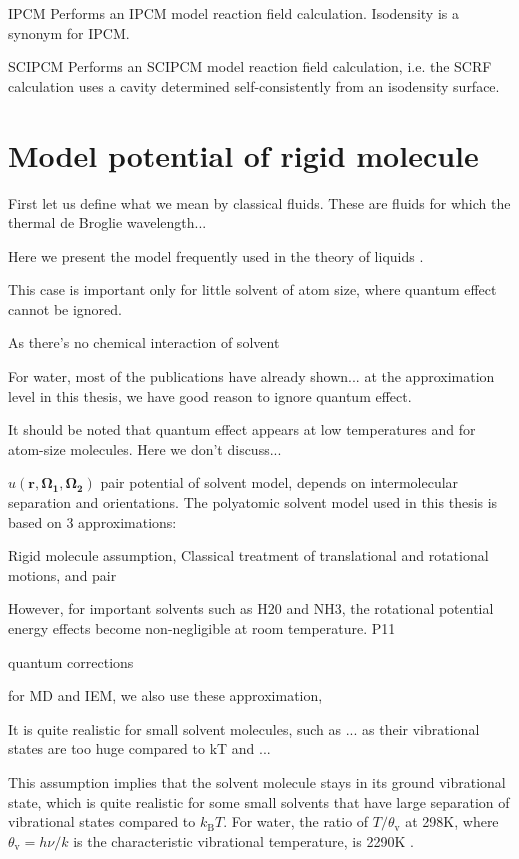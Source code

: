 IPCM Performs an IPCM model reaction field calculation. Isodensity
is a synonym for IPCM.

SCIPCM Performs an SCIPCM model reaction field calculation, i.e. the
SCRF calculation uses a cavity determined self-consistently from an
isodensity surface.


\section{Model potential of rigid molecule}

First let us define what we mean by classical fluids. These are fluids
for which the thermal de Broglie wavelength...

Here we present the model frequently used in the theory of liquids \citep{Hensen-McDonald,Gray-Gubbins}.

This case is important only for little solvent of atom size, where
quantum effect cannot be ignored.

As there's no chemical interaction of solvent

For water, most of the publications have already shown... at the approximation
level in this thesis, we have good reason to ignore quantum effect.

It should be noted that quantum effect appears at low temperatures
and for atom-size molecules. Here we don't discuss...

$u(\mathbf{r},\mathbf{\Omega_{1}},\mathbf{\Omega_{2}})$ pair potential
of solvent model, depends on intermolecular separation and orientations.
The polyatomic solvent model used in this thesis is based on 3 approximations:

Rigid molecule assumption, Classical treatment of translational and
rotational motions, and pair

However, for important solvents such as H20 and NH3, the rotational
potential energy effects become non-negligible at room temperature.
P11

quantum corrections 

for MD and IEM, we also use these approximation, 

It is quite realistic for small solvent molecules, such as ... as
their vibrational states are too huge compared to kT and ...

This assumption implies that the solvent molecule stays in its ground
vibrational state, which is quite realistic for some small solvents
that have large separation of vibrational states compared to $k_{\mathrm{B}}T$.
For water, the ratio of $T/\theta_{\mathrm{v}}$ at 298K, where $\theta_{\mathrm{v}}=h\nu/k$
is the characteristic vibrational temperature, is 2290K \citep{Gray-Gubbins}. 

